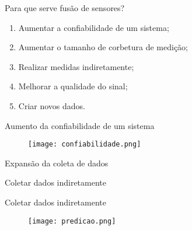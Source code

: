 \begin{frame}[t]{Para que serve fusão de sensores?}

    \begin{enumerate}
    \item Aumentar a confiabilidade de um sistema;
    \item Aumentar o tamanho de corbetura de medição;
    \item Realizar medidas indiretamente;
    \item Melhorar a qualidade do sinal;
    \item Criar novos dados.
    \end{enumerate}
\end{frame}
\begin{frame}[t]{Aumento da confiabilidade de um sistema}
    
\begin{figure}
    \texttt{[image: confiabilidade.png]}
\end{figure}
    
\end{frame}

{

\begin{frame}[t]{Expansão da coleta de dados}

\end{frame}
}
%    
%

{
\begin{frame}[t]{Coletar dados indiretamente}
\end{frame}
}

\begin{frame}[t]{Coletar dados indiretamente}
    \begin{figure}
    \texttt{[image: predicao.png]}

    \end{figure}
\end{frame}

